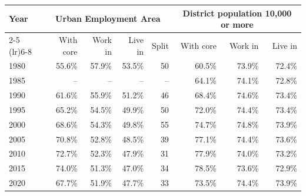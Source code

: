 \begin{tabular}{lrrrrrrr}
\toprule
Year & \multicolumn{4}{c}{Urban Employment Area} & \multicolumn{3}{c}{District population 10,000 or more} \\\cmidrule(lr){2-5} \cmidrule(lr){6-8} & With core & Work in & Live in & Split & With core & Work in & Live in \\
\midrule
1980 & 55.6\% & 57.9\% & 53.5\% & 50 & 60.5\% & 73.9\% & 72.4\% \\
1985 & -- & -- & -- & -- & 64.1\% & 74.1\% & 72.8\% \\
1990 & 61.6\% & 55.9\% & 51.2\% & 46 & 68.4\% & 74.6\% & 73.4\% \\
1995 & 65.2\% & 54.5\% & 49.9\% & 50 & 72.0\% & 74.4\% & 73.4\% \\
2000 & 68.6\% & 54.3\% & 49.8\% & 55 & 74.7\% & 74.8\% & 73.9\% \\
2005 & 70.8\% & 52.8\% & 48.5\% & 39 & 77.1\% & 74.4\% & 73.6\% \\
2010 & 72.7\% & 52.3\% & 47.9\% & 31 & 77.9\% & 74.0\% & 73.2\% \\
2015 & 74.0\% & 51.3\% & 47.0\% & 34 & 78.5\% & 73.6\% & 72.9\% \\
2020 & 67.7\% & 51.9\% & 47.7\% & 33 & 73.5\% & 74.4\% & 73.9\% \\
\bottomrule
\end{tabular}
